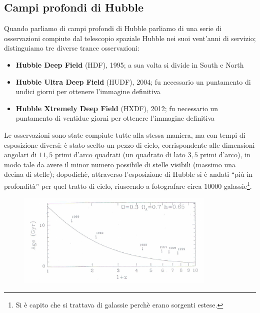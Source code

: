 \clearpage

\subsection{Campi profondi di Hubble}
Quando parliamo di campi profondi di Hubble parliamo di una serie di osservazioni compiute dal telescopio spaziale Hubble nei suoi vent'anni di servizio; distinguiamo tre diverse trance osservazioni:
\begin{itemize}
	\item \textbf{Hubble Deep Field} (HDF), 1995; a sua volta si divide in South e North
	\item \textbf{Hubble Ultra Deep Field} (HUDF), 2004; fu necessario un puntamento di undici giorni per ottenere l'immagine definitiva 
	\item \textbf{Hubble Xtremely Deep Field} (HXDF), 2012; fu necessario un puntamento di ventidue giorni per ottenere l'immagine definitiva 
\end{itemize}
Le osservazioni sono state compiute tutte alla stessa maniera, ma con tempi di esposizione diversi: è stato scelto un pezzo di cielo, corrispondente alle dimensioni angolari di $11,5$ primi d'arco quadrati (un quadrato di lato $3,5$ primi d'arco), in modo tale da avere il minor numero possibile di stelle visibili (massimo una decina di stelle); dopodichè, attraverso l'esposizione di Hubble si è andati ``più in profondità'' per quel tratto di cielo, riuscendo a fotografare circa $10000$ galassie\footnote{Si è capito che si trattava di galassie perchè erano sorgenti estese.}.

\begin{figure}[h!]
\centering
\includegraphics[width=0.85\textwidth]{Img/bertin_6.png}
\end{figure}

